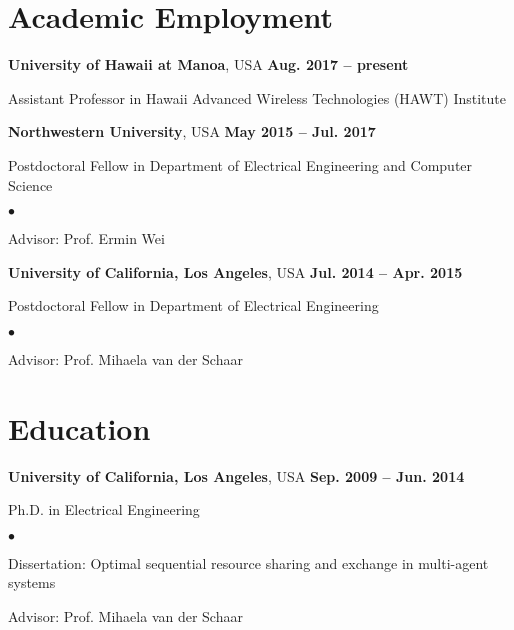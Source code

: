 \documentclass[margin,line]{res}
\newenvironment{list1}{
  \begin{list}{\ding{113}}{%
      \setlength{\itemsep}{0in}
      \setlength{\parsep}{0in} \setlength{\parskip}{0in}
      \setlength{\topsep}{0in} \setlength{\partopsep}{0in}
      \setlength{\leftmargin}{0.17in}}}{\end{list}}
\newenvironment{list2}{
  \begin{list}{$\bullet$}{%
      \setlength{\itemsep}{0in}
      \setlength{\parsep}{0in} \setlength{\parskip}{0in}
      \setlength{\topsep}{0in} \setlength{\partopsep}{0in}
      \setlength{\leftmargin}{0.2in}}}{\end{list}}
\begin{document}
\begin{resume}
\section{\sc Academic Employment}

{\bf University of Hawaii at Manoa}, USA \hfill {\bf
Aug. 2017 -- present}\\
\vspace*{-.1in}
\begin{list1}
\item[] Assistant Professor in Hawaii Advanced Wireless Technologies (HAWT) Institute
\end{list1}

{\bf Northwestern University}, USA \hfill {\bf
May 2015 -- Jul. 2017}\\
\vspace*{-.1in}
\begin{list1}
\item[] Postdoctoral Fellow in Department of Electrical Engineering and Computer Science
\begin{list2}
\vspace*{.05in}
\item Advisor: Prof. Ermin Wei
\end{list2}
\end{list1}

{\bf University of California, Los Angeles}, USA \hfill {\bf
Jul. 2014 -- Apr. 2015}\\
\vspace*{-.1in}
\begin{list1}
\item[] Postdoctoral Fellow in Department of Electrical Engineering
\begin{list2}
\vspace*{.05in}
\item Advisor: Prof. Mihaela van der Schaar
\end{list2}
\end{list1}

\section{\sc Education}
{\bf University of California, Los Angeles}, USA \hfill {\bf
Sep. 2009 -- Jun. 2014}\\
\vspace*{-.1in}
\begin{list1}
\item[] Ph.D. in Electrical Engineering
\begin{list2}
\vspace*{.05in}
\item Dissertation: Optimal sequential resource sharing and exchange in multi-agent systems
\item Advisor: Prof. Mihaela van der Schaar
\end{list2}
\end{list1}


\end{resume}
\end{document}
